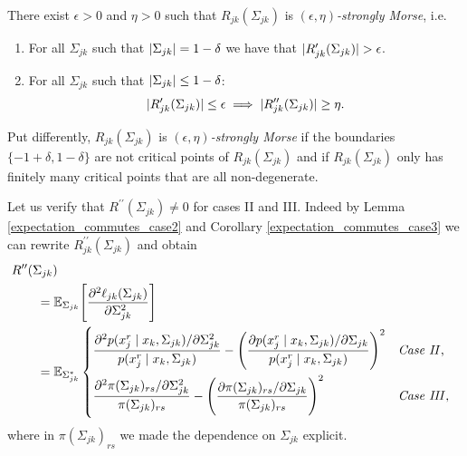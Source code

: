 \begin{condition}
    \begin{condition}
        There exist $\epsilon > 0$ and $\eta > 0$ such that $R_{jk}(\Sigma_{jk})$ is $(\epsilon,\eta)$\textit{-strongly Morse}, i.e.
        \begin{enumerate}
            \item For all $\Sigma_{jk}$ such that $\lvert\Sigma_{jk}\rvert = 1-\delta$ we have that $\lvert R_{jk}^\prime(\Sigma_{jk})\rvert > \epsilon$.
            \item For all $\Sigma_{jk}$ such that $\lvert\Sigma_{jk}\rvert \leq 1-\delta$: \[ \lvert R_{jk}^\prime(\Sigma_{jk})\rvert \leq \epsilon \implies \lvert R_{jk}^{\prime\prime}(\Sigma_{jk})\rvert \geq \eta.\]
        \end{enumerate}
        Put differently, $R_{jk}(\Sigma_{jk})$ is $(\epsilon,\eta)$\textit{-strongly Morse} if the boundaries $\{-1+ \delta, 1-\delta\}$ are not critical points of $R_{jk}(\Sigma_{jk})$ and if $R_{jk}(\Sigma_{jk})$ only has finitely many critical points that are all non-degenerate.

        Let us verify that $R^{\prime\prime}(\Sigma_{jk}) \neq 0$ for cases II and III. Indeed by Lemma \ref{expectation_commutes_case2} and Corollary \ref{expectation_commutes_case3} we can rewrite $R_{jk}^{\prime\prime}(\Sigma_{jk})$ and obtain
        \begin{align*}
            \MoveEqLeft R^{\prime\prime}(\Sigma_{jk})                                                                                                                                                                                                                                                                                                     \\
             & = \mathbb{E}_{\Sigma_{jk}}\Bigg[\frac{\partial^2 \ell_{jk}(\Sigma_{jk})}{\partial\Sigma_{jk}^2}\Bigg]                                                                                                                                                                                                                                      \\
             & = \mathbb{E}_{\Sigma_{jk}^*} \begin{dcases*}
                                                \frac{\partial^2 p(x_j^{r} \mid x_{k}, \Sigma_{jk})/\partial \Sigma_{jk}^{2}}{p(x_j^{r} \mid x_{k}, \Sigma_{jk})} - \Bigg(\frac{\partial p(x_j^{r} \mid x_{k}, \Sigma_{jk}) / \partial \Sigma_{jk}}{p(x_j^{r} \mid x_{k}, \Sigma_{jk})}\Bigg)^2 & \text{\textit{Case II}},  \\
                                                \frac{\partial^2 \pi(\Sigma_{jk})_{rs}/\partial \Sigma_{jk}^{2}}{\pi(\Sigma_{jk})_{rs}} - \Bigg(\frac{\partial \pi(\Sigma_{jk})_{rs}/\partial \Sigma_{jk}}{\pi(\Sigma_{jk})_{rs}}\Bigg)^2                                                       & \text{\textit{Case III}},
                                            \end{dcases*}
        \end{align*}
        where in $\pi(\Sigma_{jk})_{rs}$ we made the dependence on $\Sigma_{jk}$ explicit.

\end{condition}
\end{condition}
